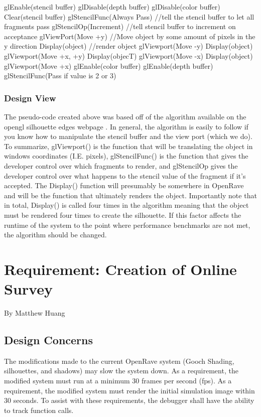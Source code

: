 \documentclass[10pt,journal,compsoc,draftclsnofoot]{IEEEtran}
\begin{document}
\begin{flushleft}
glEnable(stencil buffer)
glDisable(depth buffer)
glDisable(color buffer)
Clear(stencil buffer)
glStencilFunc(Always Pass)	//tell the stencil buffer to let all fragments pass
glStencilOp(Increment)		//tell stencil buffer to increment on acceptance
glViewPort(Move +y)	//Move object by some amount of pixels in the y direction
Display(object)		//render object
glViewport(Move -y)
Display(object)
glViewport(Move +x, +y)
Display(objecT)
glViewport(Move -x)
Display(object)
glViewport(Move +x)
glEnable(color buffer)
glEnable(depth buffer)
glStencilFunc(Pass if value is 2 or 3)

\subsubsection{Design View}
The pseudo-code created above was based off of the algorithm available on the opengl silhouette edges webpage \cite{siledges}.
In general, the algorithm is easily to follow if you know how to manipulate the stencil buffer and the view port (which we do).
To summarize, glViewport() is the function that will be translating the object in windows coordinates (I.E. pixels), glStencilFunc() is the function that gives the developer control over which fragments to render, and glStencilOp gives the developer control over what happens to the stencil value of the fragment if it’s accepted.
The Display() function will presumably be somewhere in OpenRave and will be the function that ultimately renders the object.
Importantly note that in total, Display() is called four times in the algorithm meaning that the object must be rendered four times to create the silhouette.
If this factor affects the runtime of the system to the point where performance benchmarks are not met, the algorithm should be changed.

\newpage

\section{Requirement: Creation of Online Survey}
\large{By Matthew Huang}

\normalsize
\subsection{Design Concerns}
The modifications made to the current OpenRave system (Gooch Shading, silhouettes, and shadows) may slow the system down.
As a requirement, the modified system must run at a minimum 30 frames per second (fps).
As a requirement, the modified system must render the initial simulation image within 30 seconds.
To assist with these requirements, the debugger shall have the ability to track function calls.


\end{flushleft}
\end{document}
